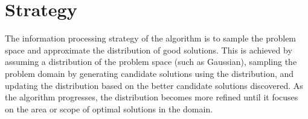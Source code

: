 \documentclass[a4paper, 11pt]{article}
\begin{document}

\section{Strategy}
\label{sec:strategy}
The information processing strategy of the algorithm is to sample the problem space and approximate the distribution of good solutions.
This is achieved by assuming a distribution of the problem space (such as Gaussian), sampling the problem domain by generating candidate solutions using the distribution, and updating the distribution based on the better candidate solutions discovered. As the algorithm progresses, the distribution becomes more refined until it focuses on the area or scope of optimal solutions in the domain.

\end{document}
